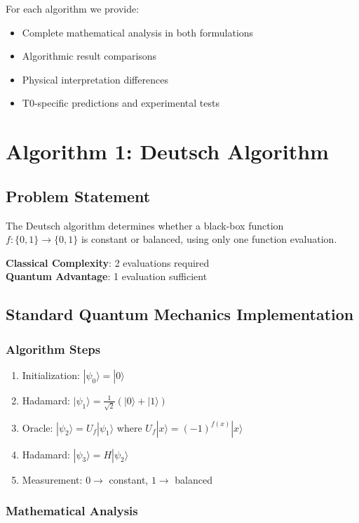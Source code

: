 	For each algorithm we provide:
	\begin{itemize}
		\item Complete mathematical analysis in both formulations
		\item Algorithmic result comparisons
		\item Physical interpretation differences
		\item T0-specific predictions and experimental tests
	\end{itemize}
	
	\section{Algorithm 1: Deutsch Algorithm}
	
	\subsection{Problem Statement}
	
	The Deutsch algorithm determines whether a black-box function $f: \{0,1\} \rightarrow \{0,1\}$ is constant or balanced, using only one function evaluation.
	
	\textbf{Classical Complexity}: 2 evaluations required \\
	\textbf{Quantum Advantage}: 1 evaluation sufficient
	
	\subsection{Standard Quantum Mechanics Implementation}
	
	\subsubsection{Algorithm Steps}
	\begin{enumerate}
		\item Initialization: $|\psi_0\rangle = |0\rangle$
		\item Hadamard: $|\psi_1\rangle = \frac{1}{\sqrt{2}}(|0\rangle + |1\rangle)$
		\item Oracle: $|\psi_2\rangle = U_f|\psi_1\rangle$ where $U_f|x\rangle = (-1)^{f(x)}|x\rangle$
		\item Hadamard: $|\psi_3\rangle = H|\psi_2\rangle$
		\item Measurement: $0 \rightarrow$ constant, $1 \rightarrow$ balanced
	\end{enumerate}
	
	\subsubsection{Mathematical Analysis}
	
